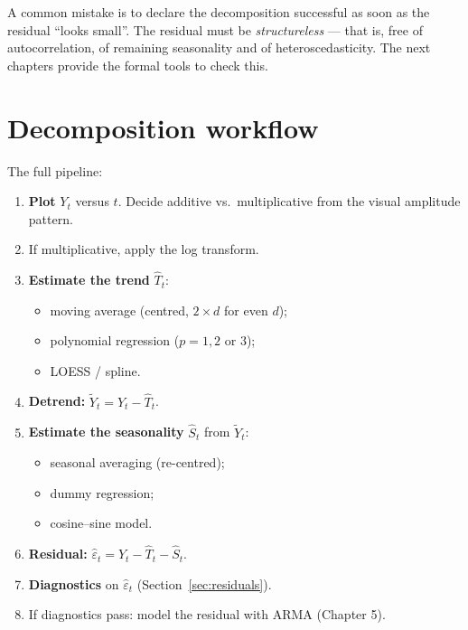 \begin{warnbox}
A common mistake is to declare the decomposition successful as soon as
the residual ``looks small''. The residual must be \emph{structureless}
— that is, free of autocorrelation, of remaining seasonality and of
heteroscedasticity. The next chapters provide the formal tools to
check this.
\end{warnbox}

\section{Decomposition workflow}
\label{sec:workflow}

The full pipeline:

\begin{enumerate}
  \item \textbf{Plot} $Y_t$ versus $t$. Decide additive vs.\ multiplicative
        from the visual amplitude pattern.
  \item If multiplicative, apply the log transform.
  \item \textbf{Estimate the trend} $\widehat{T}_t$:
        \begin{itemize}
          \item moving average (centred, $2 \times d$ for even $d$);
          \item polynomial regression ($p = 1, 2$ or $3$);
          \item LOESS / spline.
        \end{itemize}
  \item \textbf{Detrend:} $\widetilde{Y}_t = Y_t - \widehat{T}_t$.
  \item \textbf{Estimate the seasonality} $\widehat{S}_t$ from $\widetilde{Y}_t$:
        \begin{itemize}
          \item seasonal averaging (re-centred);
          \item dummy regression;
          \item cosine--sine model.
        \end{itemize}
  \item \textbf{Residual:}
        $\widehat{\varepsilon}_t = Y_t - \widehat{T}_t - \widehat{S}_t$.
  \item \textbf{Diagnostics} on $\widehat{\varepsilon}_t$ (Section~\ref{sec:residuals}).
  \item If diagnostics pass: model the residual with ARMA (Chapter 5).
\end{enumerate}

